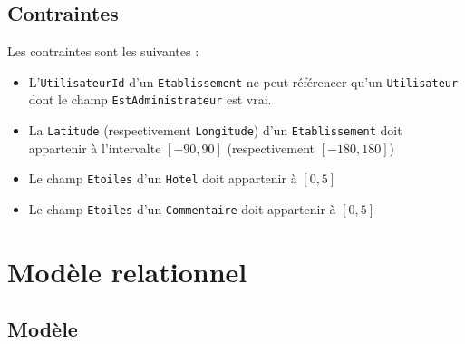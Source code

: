 \documentclass[10pt,a4paper]{article}
\begin{document}
\subsection{Contraintes}

Les contraintes sont les suivantes :
\begin{itemize}
  \item L'\texttt{UtilisateurId} d'un \texttt{Etablissement} ne peut référencer qu'un \texttt{Utilisateur} dont le champ \texttt{EstAdministrateur} est vrai.
  \item La \texttt{Latitude} (respectivement \texttt{Longitude}) d'un \texttt{Etablissement} doit appartenir à l'intervalte $[-90, 90]$ (respectivement $[-180, 180]$)
  \item Le champ \texttt{Etoiles} d'un \texttt{Hotel} doit appartenir à $[0,5]$
  \item Le champ \texttt{Etoiles} d'un \texttt{Commentaire} doit appartenir à $[0,5]$
\end{itemize}




\section{Modèle relationnel}
\subsection{Modèle}
\end{document}
